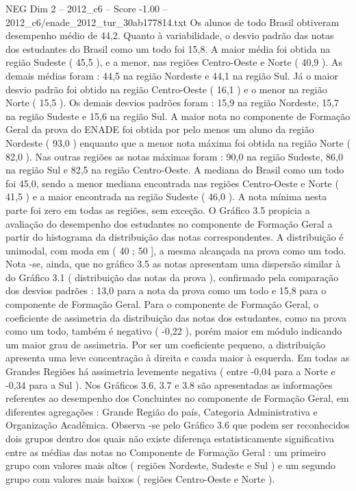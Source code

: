 \begin{textsample}{NEG Dim 2 – 2012\_c6 – Score -1.00 – 2012\_c6/enade\_2012\_tur\_30ab177814.txt}
Os alunos de todo Brasil obtiveram desempenho médio de 44,2.
Quanto à variabilidade, o desvio padrão das notas dos estudantes do Brasil como um todo foi 15,8.
A maior média foi obtida na região Sudeste ( 45,5 ), e a menor, nas regiões Centro-Oeste e Norte ( 40,9 ).
As demais médias foram : 44,5 na região Nordeste e 44,1 na região Sul.
Já o maior desvio padrão foi obtido na região Centro-Oeste ( 16,1 ) e o menor na região Norte ( 15,5 ).
Os demais desvios padrões foram : 15,9 na região Nordeste, 15,7 na região Sudeste e 15,6 na região Sul.
A maior nota no componente de Formação Geral da prova do ENADE foi obtida por pelo menos um aluno da região Nordeste ( 93,0 ) enquanto que a menor nota máxima foi obtida na região Norte ( 82,0 ).
Nas outras regiões as notas máximas foram : 90,0 na região Sudeste, 86,0 na região Sul e 82,5 na região Centro-Oeste.
A mediana do Brasil como um todo foi 45,0, sendo a menor mediana encontrada nas regiões Centro-Oeste e Norte ( 41,5 ) e a maior encontrada na região Sudeste ( 46,0 ).
A nota mínima nesta parte foi zero em todas as regiões, sem exceção.
O Gráfico 3.5 propicia a avaliação do desempenho dos estudantes no componente de Formação Geral a partir do histograma da distribuição das notas correspondentes.
A distribuição é unimodal, com moda em ( 40 ; 50 ], a mesma alcançada na prova como um todo.
Nota -se, ainda, que no gráfico 3.5 as notas apresentam uma dispersão similar à do Gráfico 3.1 ( distribuição das notas da prova ), confirmado pela comparação dos desvios padrões : 13,0 para a nota da prova como um todo e 15,8 para o componente de Formação Geral.
Para o componente de Formação Geral, o coeficiente de assimetria da distribuição das notas dos estudantes, como na prova como um todo, também é negativo ( -0,22 ), porém maior em módulo indicando um maior grau de assimetria.
Por ser um coeficiente pequeno, a distribuição apresenta uma leve concentração à direita e cauda maior à esquerda.
Em todas as Grandes Regiões há assimetria levemente negativa ( entre -0,04 para a Norte e -0,34 para a Sul ).
Nos Gráficos 3.6, 3.7 e 3.8 são apresentadas as informações referentes ao desempenho dos Concluintes no componente de Formação Geral, em diferentes agregações : Grande Região do país, Categoria Administrativa e Organização Acadêmica.
Observa -se pelo Gráfico 3.6 que podem ser reconhecidos dois grupos dentro dos quais não existe diferença estatisticamente significativa entre as médias das notas no Componente de Formação Geral : um primeiro grupo com valores mais altos ( regiões Nordeste, Sudeste e Sul ) e um segundo grupo com valores mais baixos ( regiões Centro-Oeste e Norte ).

\end{textsample}
